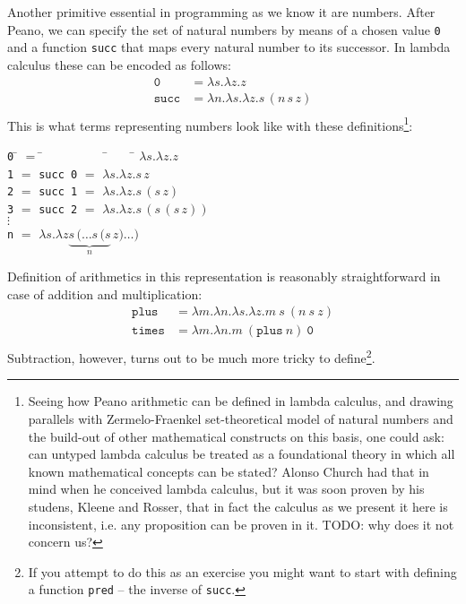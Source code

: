\documentclass[11pt,twoside,a4paper]{article} %
\newcommand{\sym}[1]{\texttt{#1}}
\newcommand{\msym}[1]{\mathtt{#1}}
\newcommand{\centeredtab}[1]{\begin{center}\parbox{0cm}{\begin{tabbing}#1\end{tabbing}}\end{center}}
\begin{document}
Another primitive essential in programming as we know it are numbers. After
Peano, we can specify the set of natural numbers by means of a chosen value
\sym{0} and a function \sym{succ} that maps every natural number to
its successor. In lambda calculus these can be encoded as follows:
\begin{align*}
\msym{0}    &= \lambda s.\lambda z.z \\
\msym{succ} &= \lambda n.\lambda s.\lambda z.s\,(n\,s\,z) \\
\end{align*}
This is what terms representing numbers look like with these 
definitions\footnote{Seeing how Peano arithmetic can be defined in lambda calculus,
and drawing parallels with Zermelo-Fraenkel set-theoretical model of
natural numbers and the build-out of other mathematical constructs on this
basis, one could ask: can untyped lambda calculus be treated as a foundational
theory in which all known mathematical concepts can be stated? Alonso Church had 
that in mind when he conceived lambda calculus, but it was soon proven by his 
studens, Kleene and Rosser\cite{wkrp}, that in fact the calculus as we present it here is 
inconsistent, i.e. any proposition can be proven in it. TODO: why does it not
concern us?}:
\centeredtab{
\sym{0} \= $=$ \= ~~~~~~~~~    \= ~~~ \= $\lambda s.\lambda z.z$    \\
\sym{1} \> $=$ \> \sym{succ 0} \> $=$ \> $\lambda s.\lambda z.s\,z$ \\
\sym{2} \> $=$ \> \sym{succ 1} \> $=$ \> $\lambda s.\lambda z.s\,(s\,z)$ \\
\sym{3} \> $=$ \> \sym{succ 2} \> $=$ \> $\lambda s.\lambda z.s\,(s\,(s\,z))$ \\
$\vdots$ \\
\sym{n} \> $=$ \> \> \> $\lambda s.\lambda z\underbrace{s\,(\dots s\,(s}_n\,z)\dots)$
\\
}
Definition of arithmetics in this representation is reasonably straightforward
in case of addition and multiplication:
\begin{align*}
\msym{plus}  &= \lambda m.\lambda n.\lambda s. \lambda z.m\ s\ (n\ s\ z) \\
\msym{times} &= \lambda m.\lambda n.m\ (\msym{plus}\ n)\ \msym{0} \\
\end{align*}
Subtraction, however, turns out to be much more tricky to define\footnote{If
you attempt to do this as an exercise you might want to start with defining a
function \sym{pred} -- the inverse of \sym{succ}.}.
\end{document}
